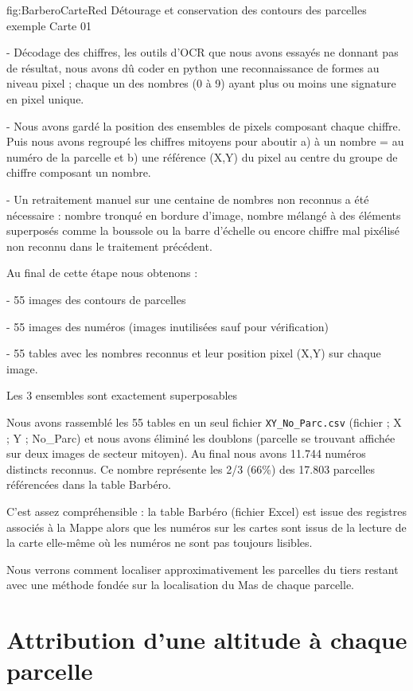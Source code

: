 {fig:BarberoCarteRed}
{Détourage et conservation des contours des parcelles exemple Carte 01}



-	Décodage des chiffres, les outils d’OCR que nous avons essayés ne donnant pas de résultat, nous avons dû coder en python une reconnaissance de formes au niveau pixel ; chaque un des nombres (0 à 9) ayant plus ou moins une signature en pixel unique.

-	Nous avons gardé la position des ensembles de pixels composant chaque chiffre. Puis nous avons regroupé les chiffres mitoyens pour aboutir a) à un nombre = au numéro de la parcelle et b) une référence (X,Y) du pixel au centre du groupe de chiffre composant un nombre.

-	Un retraitement manuel sur une centaine de nombres non reconnus a été nécessaire : nombre tronqué en bordure d’image, nombre mélangé à des éléments superposés comme la boussole ou la barre d’échelle ou encore chiffre mal pixélisé non reconnu dans le traitement précédent.

Au final de cette étape nous obtenons :

-	55 images des contours de parcelles 

- 	55 images des numéros (images inutilisées sauf pour vérification)

-	55 tables avec les nombres reconnus et leur position pixel (X,Y) sur chaque image.

Les 3 ensembles sont exactement superposables

Nous avons rassemblé les 55 tables en un seul fichier \texttt{XY\_No\_Parc.csv} (fichier ; X ; Y ; No\_Parc) et nous avons éliminé les doublons (parcelle se trouvant affichée sur deux images de secteur mitoyen). Au final nous avons 11.744 numéros distincts reconnus. Ce nombre représente les 2/3 (66\%) des 17.803 parcelles référencées dans la table Barbéro.

C'est assez compréhensible : la table Barbéro (fichier Excel) est issue des registres associés à la Mappe alors que les numéros sur les cartes sont issus de la lecture de la carte elle-même où les numéros ne sont pas toujours lisibles.

Nous verrons comment localiser approximativement les parcelles du tiers restant avec une méthode fondée sur la localisation du Mas de chaque parcelle. 




\section{Attribution d’une altitude à chaque parcelle}


